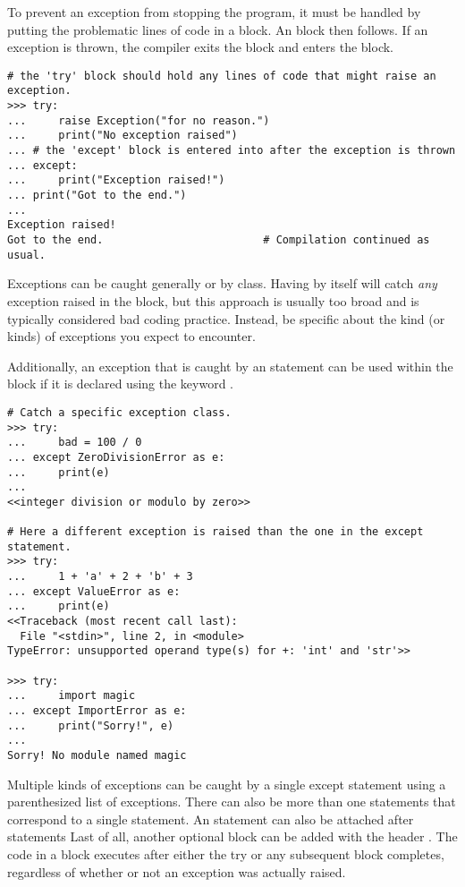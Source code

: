 To prevent an exception from stopping the program, it must be handled by
putting the problematic lines of code in a  block.
An  block then follows.
If an exception is thrown, the compiler exits the  block and enters the  block.

\begin{lstlisting}
# the 'try' block should hold any lines of code that might raise an exception.
>>> try:
...     raise Exception("for no reason.")
...     print("No exception raised")
... # the 'except' block is entered into after the exception is thrown
... except:
...     print("Exception raised!")
... print("Got to the end.")
... 
Exception raised!
Got to the end.                         # Compilation continued as usual.
\end{lstlisting}

Exceptions can be caught generally or by class.
Having  by itself will catch \emph{any} exception raised in the  block, but this approach is usually too broad and is typically considered bad coding practice.
Instead, be specific about the kind (or kinds) of exceptions you expect to encounter.

Additionally, an exception that is caught by an  statement can be used within the  block if it is declared using the keyword .

\begin{lstlisting}
# Catch a specific exception class.
>>> try:
...     bad = 100 / 0
... except ZeroDivisionError as e:
...     print(e)
... 
<<integer division or modulo by zero>>

# Here a different exception is raised than the one in the except statement.
>>> try:
...     1 + 'a' + 2 + 'b' + 3
... except ValueError as e:
...     print(e)
<<Traceback (most recent call last):
  File "<stdin>", line 2, in <module>
TypeError: unsupported operand type(s) for +: 'int' and 'str'>>

>>> try:
...     import magic
... except ImportError as e:
...     print("Sorry!", e)
... 
Sorry! No module named magic
\end{lstlisting}

Multiple kinds of exceptions can be caught by a single except statement using a parenthesized list of exceptions.
There can also be more than one  statements that correspond to a single  statement.
An  statement can also be attached after  statements
Last of all, another optional block can be added with the header .
The code in a  block executes after either the try or any subsequent block completes, regardless of whether or not an exception was actually raised.

